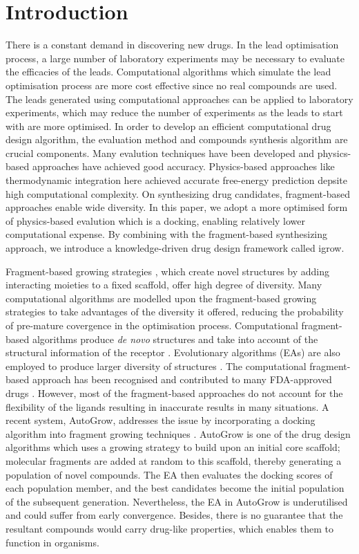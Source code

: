 \documentclass[10pt,conference,letterpaper]{IEEEtran}
\begin{document}
\section{Introduction}\label{sec:introduction}
There is a constant demand in discovering new drugs.
In the lead optimisation process, a large number of laboratory experiments may be necessary to evaluate the efficacies of the leads.
Computational algorithms which simulate the lead optimisation process are more cost effective since no real compounds are used.
The leads generated using computational approaches can be applied to laboratory experiments, which may reduce the number of experiments as the leads to start with are more optimised.
In order to develop an efficient computational drug design algorithm, the evaluation method and compounds synthesis algorithm are crucial components.
Many evalution techniques have been developed and physics-based approaches have achieved good accuracy. Physics-based approaches like thermodynamic integration \cite{ref24,VelazquezCampoy2001217} here achieved accurate free-energy prediction depsite high computational complexity.
On synthesizing drug candidates, fragment-based approaches enable wide diversity.
In this paper, we adopt a more optimised form of physics-based evalution which is a docking, enabling relatively lower computational expense.
By combining with the fragment-based synthesizing approach, we introduce a knowledge-driven drug design framework called igrow.

Fragment-based growing strategies \cite{ref11,ref20}, which create novel structures by adding interacting moieties to a fixed scaffold, offer high degree of diversity.
Many computational algorithms are modelled upon the fragment-based growing strategies to take advantages of the diversity it offered, reducing the probability of pre-mature covergence in the optimisation process.
Computational fragment-based algorithms produce {\itshape de novo} structures \cite{ref4,ref5,ref6,ref8} and take into account of the structural information of the receptor \cite{ref3}.
Evolutionary algorithms (EAs) are also employed to produce larger diversity of structures \cite{ref7,ref9}.
The computational fragment-based approach has been recognised and contributed to many FDA-approved drugs \cite{ref2}.
However, most of the fragment-based approaches do not account for the flexibility of the ligands resulting in inaccurate results in many situations.
A recent system, AutoGrow, addresses the issue by incorporating a docking algorithm into fragment growing techniques \cite{RefWorks:114}.
AutoGrow is one of the drug design algorithms which uses a growing strategy to build upon an initial core scaffold; molecular fragments are added at random to this scaffold, thereby generating a population of novel compounds.
The EA then evaluates the docking scores of each population member, and the best candidates become the initial population of the subsequent generation.
Nevertheless, the EA in AutoGrow is underutilised and could suffer from early convergence.
Besides, there is no guarantee that the resultant compounds would carry drug-like properties, which enables them to function in organisms.
\end{document}
